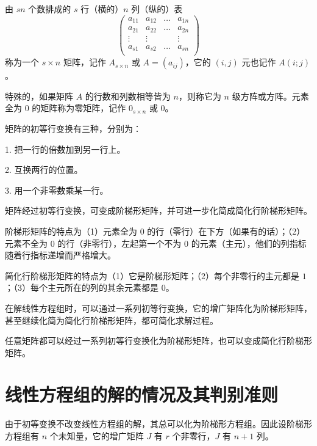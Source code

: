 \begin{definition}
	由 $sn$ 个数排成的 $s$ 行（横的）$n$ 列（纵的）表
	\begin{equation*}
		\left(
			\begin{matrix}
				a_{11}&a_{12}&\ldots&a_{1n}\\
				a_{21}&a_{22}&\ldots&a_{2n}\\
				\vdots&\vdots&&\vdots\\a_{s1}&a_{s2}&\ldots&a_{sn}\\
			\end{matrix}
		\right)
	\end{equation*}
	称为一个 $s\times n$ 矩阵，记作 $A_{s\times n}$ 或 $A=(a_{ij})$，它的 $(i,j)$ 元也记作 $A(i;j)$。
\end{definition}

特殊的，如果矩阵 $A$ 的行数和列数相等皆为 $n$，则称它为 $n$ 级方阵或方阵。元素全为 $0$ 的矩阵称为零矩阵，记作 $0_{s\times n}$ 或 $0$。

\begin{definition}[初等行变换]
	矩阵的初等行变换有三种，分别为：
	
	1. 把一行的倍数加到另一行上。

	2. 互换两行的位置。

	3. 用一个非零数乘某一行。
\end{definition}

矩阵经过初等行变换，可变成阶梯形矩阵，并可进一步化简成简化行阶梯形矩阵。

阶梯形矩阵的特点为（1）元素全为 $0$ 的行（零行）在下方（如果有的话）；（2）元素不全为 $0$ 的行（非零行），左起第一个不为 $0$ 的元素（主元），他们的列指标随着行指标递增而严格增大。

简化行阶梯形矩阵的特点为（1）它是阶梯形矩阵；（2）每个非零行的主元都是 $1$；（3）每个主元所在的列的其余元素都是 $0$。

在解线性方程组时，可以通过一系列初等行变换，它的增广矩阵化为阶梯形矩阵，甚至继续化简为简化行阶梯形矩阵，都可简化求解过程。

\begin{theorem}
	任意矩阵都可以经过一系列初等行变换化为阶梯形矩阵，也可以变成简化行阶梯形矩阵。
\end{theorem}

\section{线性方程组的解的情况及其判别准则}


由于初等变换不改变线性方程组的解，其总可以化为阶梯形方程组。因此设阶梯形方程组有 $n$ 个未知量，它的增广矩阵 $J$ 有 $r$ 个非零行，$J$ 有 $n+1$ 列。

